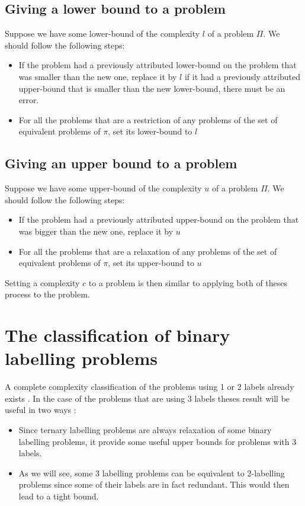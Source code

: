 \subsection{Giving a lower bound to a problem}
Suppose we have some lower-bound of the complexity $l$ of a problem $\Pi$. We should follow the following steps:
\begin{itemize}
    \item If the problem had a previously attributed lower-bound on the problem that was smaller than the new one, replace it by $l$ if it had a previously attributed upper-bound that is smaller than the new lower-bound, there must be an error.
    \item For all the problems that are a restriction of any problems of the set of equivalent problems of $\pi$, set its lower-bound to $l$
\end{itemize}
\subsection{Giving an upper bound to a problem}
Suppose we have some upper-bound of the complexity $u$ of a problem $\Pi$. We should follow the following steps:
\begin{itemize}
    \item If the problem had a previously attributed upper-bound on the problem that was bigger than the new one, replace it by $u$
    \item For all the problems that are a relaxation of any problems of the set of equivalent problems of $\pi$, set its upper-bound to $u$
\end{itemize}
Setting a complexity $c$ to a problem is then similar to applying both of theses process to the problem.


\section{The classification of binary labelling problems}\label{sec:BLP}
A complete complexity classification of the problems using 1 or 2 labels already exists \cite{1}. In the case of the problems that are using 3 labels theses result will be useful in two ways :
\begin{itemize}
    \item Since ternary labelling problems are always relaxation of some binary labelling problems, it provide some useful upper bounds for problems with 3 labels.
    \item As we will see, some 3 labelling problems can be equivalent to 2-labelling problems since some of their labels are in fact redundant. This would then lead to a tight bound.
\end{itemize}
